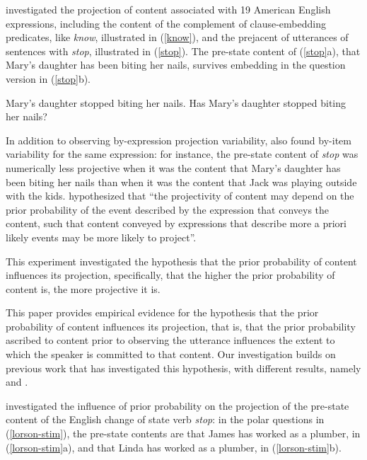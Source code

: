 \documentclass[11pt,fleqn]{article}
\newcommand{\6}{\mbox{$[\hspace*{-.6mm}[$}}
\newcommand{\9}{\mbox{$]\hspace*{-.6mm}]$}}
\begin{document}
\citealt{tbd-variability} investigated the projection of content associated with 19 American English expressions, including the content of the complement of clause-embedding predicates, like {\em know}, illustrated in (\ref{know}), and the prejacent of utterances of sentences with {\em stop}, illustrated in (\ref{stop}). The pre-state content of (\ref{stop}a), that Mary's daughter has been biting her nails, survives embedding in the question version in (\ref{stop}b).

\begin{exe}
\ex\label{stop}
\begin{xlist}
\ex Mary's daughter stopped biting her nails.
\ex Has Mary's daughter stopped biting her nails?
\end{xlist}
\end{exe}
In addition to observing by-expression projection variability, \citealt{tbd-variability} also found by-item variability for the same expression: for instance, the pre-state content of {\em stop} was numerically less projective when it was the content that Mary's daughter has been biting her nails than when it was the content that Jack was playing outside with the kids. \citealt[500]{tbd-variability} hypothesized that ``the projectivity of content may depend on the prior probability of the event described by the expression that conveys the content, such that content conveyed by expressions that describe more a priori likely events may be more likely to project''.


This experiment investigated the hypothesis that the prior probability of content influences its projection, specifically, that the higher the prior probability of content is, the more projective it is.

This paper provides empirical evidence for the hypothesis that the prior probability of content influences its projection, that is, that the prior probability ascribed to content prior to observing the utterance influences the extent to which the speaker is committed to that content. Our investigation builds on previous work that has investigated this hypothesis, with different results, namely \citealt{lorson2018} and \citealt{mahler2020}.  

\citet{lorson2018} investigated the influence of prior probability on the projection of the pre-state content of the English change of state verb {\em stop}: in the polar questions in (\ref{lorson-stim}), the pre-state contents are that James has worked as a plumber, in (\ref{lorson-stim}a), and that Linda has worked as a plumber, in (\ref{lorson-stim}b).
\end{document}
